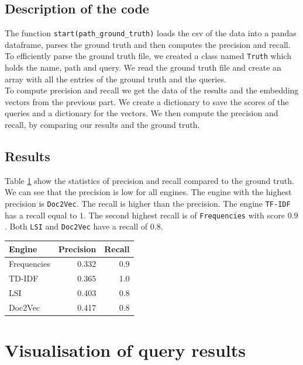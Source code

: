 \documentclass [14 pt]{article}
\begin{document}
\subsection{Description of the code} %
The function \texttt{start(path\_ground\_truth)} loads the csv of the data  into a pandas dataframe, parses the ground truth and then computes the precision and recall.\\
To efficiently parse the ground truth file, we created a class named \texttt{Truth} which holds the name, path and query. We read the ground truth file and create an array with all the entries of the ground truth and the queries.\\
To compute precision and recall we get the data of the results and the embedding vectors from the previous part. We create a dictionary to save the scores of the queries and a dictionary for the vectors. We then compute the precision and recall, by comparing our results and the ground truth.

\subsection{Results} %
Table \ref{tab:Evaluation} show the statistics of precision and recall compared to the ground truth.
We can see that the precision is low for all engines. The engine with the highest precision is \texttt{Doc2Vec}. 
The recall is higher than the precision. The engine \texttt{TF-IDF} has a recall equal to $1$. The second highest recall is of \texttt{Frequencies} with score $0.9$. Both \texttt{LSI} and \texttt{Doc2Vec} have a recall of $0.8$.

\begin{table}[h]
\centering
\begin{tabular}{| l r r |}
\hline
\textbf{Engine}	&  \textbf{Precision}	&  \textbf{Recall}	\\ \hline\hline
Frequencies 		&	0.332	&	0.9	\\
TD-IDF			&	0.365	&	1.0	\\
LSI				&	0.403	&	0.8	\\
Doc2Vec			&	0.417	&	0.8	\\ \hline
\end{tabular}
\label{tab:Evaluation}
\end{table}


\section{Visualisation of query results} %
\end{document}
